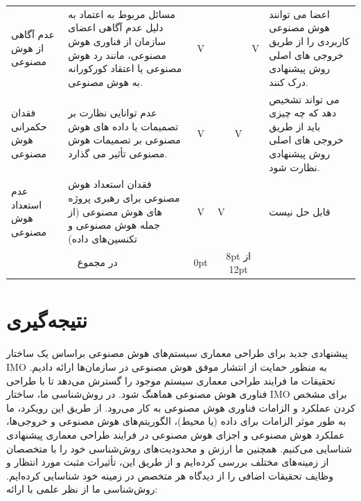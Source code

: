 \documentclass[a4paper,10pt]{article}
\begin{document}
\begin{table}
\begin{tabularx}{\textwidth}{ p{1.5cm} p{6.5cm} c c c c p{5.5cm} }
                    عدم آگاهی از هوش مصنوعی & مسائل مربوط به اعتماد به دلیل عدم آگاهی اعضای سازمان از فناوری هوش مصنوعی، مانند رد هوش مصنوعی یا اعتقاد کورکورانه به هوش مصنوعی. & V &  &  & V & اعضا می توانند هوش مصنوعی کاربردی را از طریق خروجی های اصلی روش پیشنهادی درک کنند. \\

                    فقدان حکمرانی هوش مصنوعی & عدم توانایی نظارت بر تصمیمات یا داده های هوش مصنوعی بر تصمیمات هوش مصنوعی تأثیر می گذارد. & V &  & V &  & می تواند تشخیص دهد که چه چیزی باید از طریق خروجی های اصلی روش پیشنهادی نظارت شود. \\

                    عدم استعداد هوش مصنوعی & فقدان استعداد هوش مصنوعی برای رهبری پروژه های هوش مصنوعی (از جمله هوش مصنوعی و تکنسین‌های داده) & V & V &  &  & قابل حل نیست \\

                    \hline

                    \multicolumn{2}{c}{در مجموع} & 0pt & \multicolumn{3}{c}{8pt از 12pt} \\

                    \hline

                \end{tabularx}

            \end{table}

    \section{نتیجه‌گیری}

        پیشنهادی جدید برای طراحی معماری سیستم‌های هوش مصنوعی براساس یک ساختار IMO به منظور حمایت از انتشار موفق هوش مصنوعی در سازمان‌ها ارائه دادیم. تحقیقات ما فرایند طراحی معماری سیستم موجود را گسترش می‌دهد تا با طراحی فناوری هوش مصنوعی هماهنگ شود. در روش‌شناسی ما، ساختار IMO برای مشخص کردن عملکرد و الزامات فناوری هوش مصنوعی به کار می‌رود. از طریق این رویکرد، ما به طور موثر الزامات برای داده (یا محیط)، الگوریتم‌های هوش مصنوعی و خروجی‌ها، عملکرد هوش مصنوعی و اجزای هوش مصنوعی در فرایند طراحی معماری پیشنهادی شناسایی می‌کنیم. همچنین ما ارزش و محدودیت‌های روش‌شناسی خود را با متخصصان از زمینه‌های مختلف بررسی کرده‌ایم و از طریق این، تأثیرات مثبت مورد انتظار و وظایف تحقیقات اضافی را از دیدگاه هر متخصص در زمینه خود شناسایی کرده‌ایم. روش‌شناسی ما از نظر علمی با ارائه:
    
\end{document}
